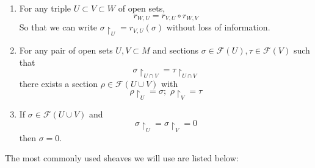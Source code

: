 \begin{enumerate}
\item For any triple $U \subset V \subset W$ of open sets, 
	\[
		r_{W,U} = r_{V,U} \circ r_{W,V}
	\]
	So that we can write $\sigma \restriction_U = r_{V,U} \left( \sigma \right) $ without loss of information.
\item For any pair of open sets $U, V \subset M$ and sections $\sigma \in \mathcal{F}(U), \tau \in \mathcal{F}(V)$ such that 
\[
	\sigma \restriction_{U \cap V} = \tau \restriction_{U \cap V}
\]
there exists a section $ \rho \in \mathcal{F}(U \cup V)$ with 
\[
\rho \restriction_U = \sigma; \hspace{4pt} \rho \restriction_V = \tau
\]
\item If $\sigma \in \mathcal{F}(U \cup V)$ and
\[
\sigma \restriction_U = \sigma \restriction_V = 0
\]
then $\sigma = 0$.
\end{enumerate}

The most commonly used sheaves we will use are listed below:

